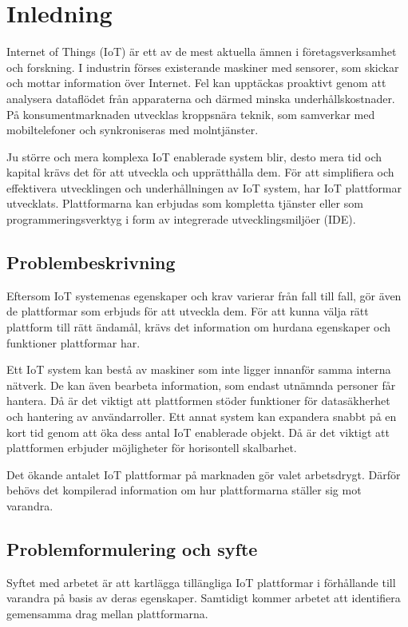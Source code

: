 
\section{Inledning}
Internet of Things (IoT) är ett av de mest aktuella ämnen i företagsverksamhet
och forskning. I industrin förses existerande maskiner med sensorer, som
skickar och mottar information över Internet. Fel kan upptäckas proaktivt
genom att analysera dataflödet från apparaterna och därmed minska
underhållskostnader.
På konsumentmarknaden utvecklas kroppsnära teknik, som samverkar med
mobiltelefoner och synkroniseras med molntjänster.

Ju större och mera komplexa IoT enablerade system blir, desto mera tid och
kapital krävs det för att utveckla och upprätthålla dem.
För att simplifiera och effektivera utvecklingen och underhållningen av
IoT system, har IoT plattformar utvecklats. Plattformarna kan erbjudas
som kompletta tjänster eller som programmeringsverktyg i form av
integrerade utvecklingsmiljöer (IDE).



\subsection{Problembeskrivning}
Eftersom IoT systemenas egenskaper och krav varierar från fall till fall,
gör även de plattformar som erbjuds för att utveckla dem. För att kunna
välja rätt plattform till rätt ändamål, krävs det information om hurdana
egenskaper och funktioner plattformar har.

Ett IoT system kan bestå av maskiner som inte ligger innanför samma
interna nätverk. De kan även bearbeta information, som endast utnämnda
personer får hantera. Då är det viktigt att plattformen stöder
funktioner för datasäkherhet och hantering av användarroller.
Ett annat system kan expandera snabbt på en kort tid genom att öka dess antal
IoT enablerade objekt. Då är det viktigt att plattformen erbjuder möjligheter
för horisontell skalbarhet.

Det ökande antalet IoT plattformar på marknaden gör valet arbetsdrygt.
Därför behövs det kompilerad information om hur plattformarna ställer sig
mot varandra.


\subsection{Problemformulering och syfte}
Syftet med arbetet är att kartlägga tillängliga IoT plattformar i förhållande
till varandra på basis av deras egenskaper. Samtidigt kommer arbetet
att identifiera gemensamma drag mellan plattformarna. 

